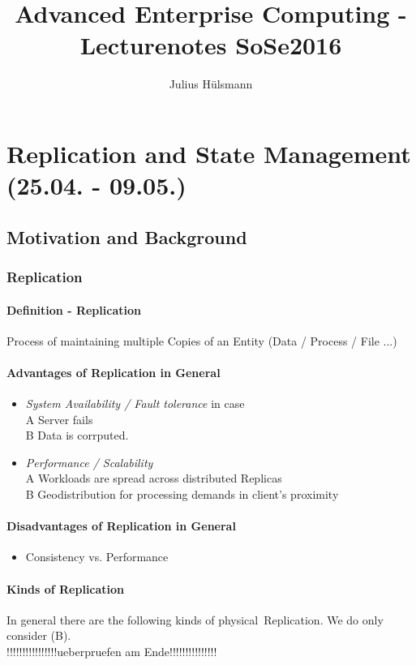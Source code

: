\documentclass[a4paper,12pt]{article}%
\title{Advanced Enterprise Computing - Lecturenotes SoSe2016}
\author{Julius Hülsmann}
\newcommand{\grafik}[2]{\begin{figure}[!htb]
		\noindent\texttt{[image: \#1]}
		\caption{\textrm{#2}}%
	\end{figure}}
\begin{document}
  \maketitle
  \tableofcontents
  \newpage
\section{Replication and State Management\\ (25.04. - 09.05.)}


\subsection{Motivation and Background}

\subsubsection{Replication}
\paragraph{Definition - Replication}
Process of maintaining multiple Copies of an Entity (Data / Process / File ...)

\paragraph{Advantages of Replication in General}
\begin{itemize}
	\item {\it System Availability / Fault tolerance} in case \\
	A \quad Server fails \\
	B \quad Data is corrputed.
	\item {\it Performance / Scalability } \\
	A \quad Workloads are spread across distributed Replicas \\
	B \quad Geodistribution for processing demands in client's proximity
\end{itemize} 

\paragraph{Disadvantages of Replication in General}
\begin{itemize}
	\item Consistency vs. Performance
\end{itemize}
\paragraph{Kinds of Replication}
In general there are the following kinds of \glqq physical\grqq ~Replication. We do only consider (B).\\
\color{red} !!!!!!!!!!!!!!!!ueberpruefen am Ende!!!!!!!!!!!!!!! \color{black}
\end{document}
